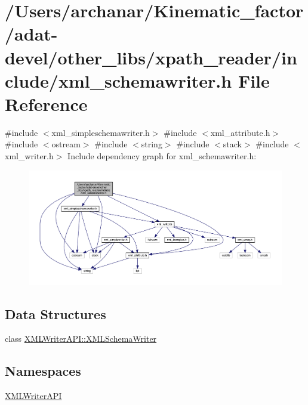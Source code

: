 \hypertarget{adat-devel_2other__libs_2xpath__reader_2include_2xml__schemawriter_8h}{}\section{/\+Users/archanar/\+Kinematic\+\_\+factor/adat-\/devel/other\+\_\+libs/xpath\+\_\+reader/include/xml\+\_\+schemawriter.h File Reference}
\label{adat-devel_2other__libs_2xpath__reader_2include_2xml__schemawriter_8h}
{\ttfamily \#include $<$xml\+\_\+simpleschemawriter.\+h$>$}\newline
{\ttfamily \#include $<$xml\+\_\+attribute.\+h$>$}\newline
{\ttfamily \#include $<$ostream$>$}\newline
{\ttfamily \#include $<$string$>$}\newline
{\ttfamily \#include $<$stack$>$}\newline
{\ttfamily \#include $<$xml\+\_\+writer.\+h$>$}\newline
Include dependency graph for xml\+\_\+schemawriter.\+h\+:
\nopagebreak
\begin{figure}[H]
\begin{center}
\leavevmode
\includegraphics[width=350pt]{d9/d6d/adat-devel_2other__libs_2xpath__reader_2include_2xml__schemawriter_8h__incl}
\end{center}
\end{figure}
\subsection*{Data Structures}
\begin{DoxyCompactItemize}
\item 
class \mbox{\hyperlink{classXMLWriterAPI_1_1XMLSchemaWriter}{X\+M\+L\+Writer\+A\+P\+I\+::\+X\+M\+L\+Schema\+Writer}}
\end{DoxyCompactItemize}
\subsection*{Namespaces}
\begin{DoxyCompactItemize}
\item 
 \mbox{\hyperlink{namespaceXMLWriterAPI}{X\+M\+L\+Writer\+A\+PI}}
\end{DoxyCompactItemize}
